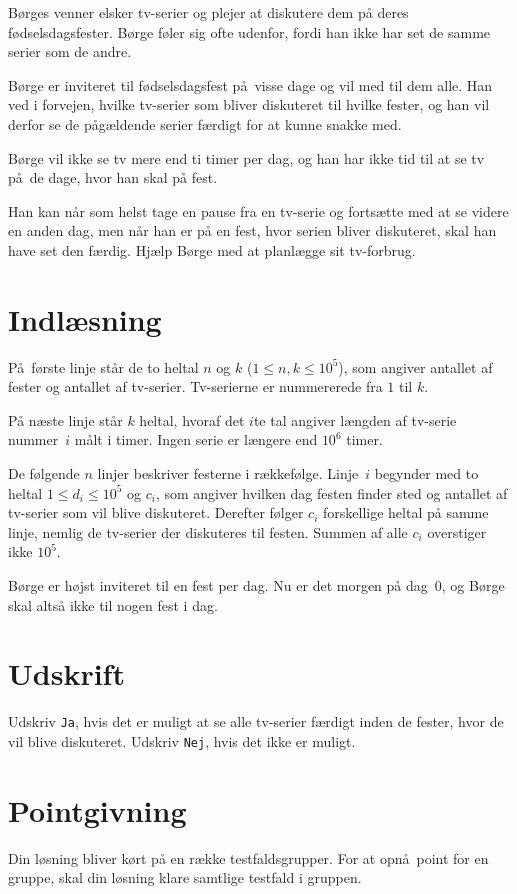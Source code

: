 Børges venner elsker tv-serier og plejer at diskutere dem på deres fødselsdagsfester.
Børge føler sig ofte udenfor, fordi han ikke har set de samme serier som de andre.

Børge er inviteret til fødselsdagsfest på visse dage og vil med til dem alle.
Han ved i forvejen, hvilke tv-serier som bliver diskuteret til hvilke fester, og han vil derfor se de pågældende serier færdigt for at kunne snakke med.

Børge vil ikke se tv mere end ti timer per dag, og han har ikke tid til at se tv på de dage, hvor han skal på fest.

Han kan når som helst tage en pause fra en tv-serie og fortsætte med at se videre en anden dag, men når han er på en fest, hvor serien bliver diskuteret, skal han have set den færdig.
Hjælp Børge med at planlægge sit tv-forbrug.

\section*{Indlæsning}
På første linje står de to heltal $n$ og $k$ ($1 \leq n,k \leq 10^5$), som angiver antallet af fester og antallet af tv-serier.
Tv-serierne er nummererede fra $1$ til $k$.

På næste linje står $k$ heltal, hvoraf det $i$te tal angiver længden af tv-serie nummer~$i$ målt i timer.
Ingen serie er længere end $10^6$ timer.

De følgende $n$ linjer beskriver festerne i rækkefølge.
Linje~$i$ begynder med to heltal $1 \leq d_i \leq 10^5$ og $c_i$, som angiver hvilken dag festen finder sted og antallet af tv-serier som vil blive diskuteret.
Derefter følger $c_i$ forskellige heltal på samme linje, nemlig de tv-serier der diskuteres til festen.
Summen af alle $c_i$ overstiger ikke $10^5$.

Børge er højst inviteret til en fest per dag. 
Nu er det morgen på dag~$0$,  og Børge skal altså ikke til nogen fest i dag.

\section*{Udskrift}
Udskriv \texttt{Ja}, hvis det er muligt at se alle tv-serier færdigt inden de fester, hvor de vil blive diskuteret.
Udskriv \texttt{Nej}, hvis det ikke er muligt.

\section*{Pointgivning}
Din løsning bliver kørt på en række testfaldsgrupper.
For at opnå point for en gruppe, skal din løsning klare samtlige testfald i gruppen.

